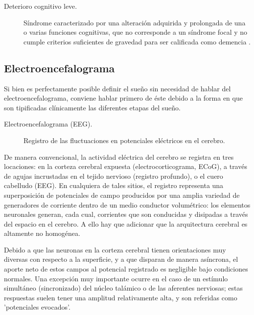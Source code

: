 \documentclass[12pt,a4paper]{mitthesis}
\begin{document}
\begin{description}
\item[Deterioro cognitivo leve.] S\'indrome caracterizado por una alteraci\'on adquirida y 
prolongada de una o varias funciones cognitivas, que no corresponde a un s\'indrome focal y no 
cumple criterios suficientes de gravedad para ser calificada como demencia \cite{Robles02}.
\end{description}


\subsection{Electroencefalograma}

Si bien es perfectamente posible definir el sue\~no sin necesidad de hablar del 
electroencefalograma, conviene hablar primero de \'este debido a la forma en que son tipificadas
cl\'inicamente las diferentes etapas del sue\~no.

\begin{description}
\item[Electroencefalograma (EEG).] Registro de las fluctuaciones en potenciales el\'ectricos en el 
cerebro.
\end{description}

De manera convencional, la actividad el\'ectrica del cerebro se registra en tres locaciones: en la 
corteza cerebral expuesta (electrocorticograma, ECoG), a trav\'es de agujas incrustadas en el 
tejido nervioso (registro profundo), o el cuero cabelludo (EEG).
En cualquiera de tales sitios, el registro representa una superposici\'on de potenciales de campo 
producidos por una amplia variedad de generadores de corriente dentro de un medio conductor 
volum\'etrico: los elementos neuronales generan, cada cual, corrientes que son conducidas y 
disipadas a trav\'es del espacio en el cerebro.
A ello hay que adicionar que la arquitectura cerebral es altamente no homog\'enea.

Debido a que las neuronas en la corteza cerebral tienen orientaciones muy diversas con respecto a 
la superficie, y a que disparan de manera as\'incrona, el aporte neto de estos campos al potencial 
registrado es negligible bajo condiciones normales.
Una excepci\'on muy importante ocurre en el caso de un est\'imulo simult\'aneo (sincronizado)
del n\'ucleo tal\'amico o de las aferentes nerviosas; estas respuestas suelen tener una amplitud 
relativamente alta, y son referidas como 'potenciales evocados'.
\end{document}
